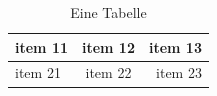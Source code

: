 \begin{table}[h]
    \centering %
    \begin{tabular}{|l|c|r|} %
    \hline %
    item 11 & item 12 & item 13 \\ %
    \hline
    item 21  & item 22  & item 23  \\
    \hline
    \end{tabular}
    \caption{Eine Tabelle}
    \label{tab:tabelle1}
\end{table}
